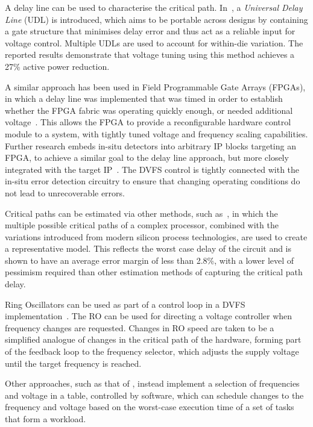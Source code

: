 \documentclass[a4paper,twocolumn,DIV=16]{scrartcl}
\begin{document}
A delay line can be used to characterise the critical path.
In~\cite{Ikenaga2011}, a \emph{Universal Delay Line} (UDL) is introduced, which
aims to be portable across designs by containing a gate structure that minimises
delay error and thus act as a reliable input for voltage control. Multiple UDLs
are used to account for within-die variation. The reported results demonstrate
that voltage tuning using this method achieves a 27\% active power reduction.

A similar approach has been used in Field Programmable Gate Arrays (FPGAs), in
which a delay line was implemented that was timed in order to establish whether
the FPGA fabric was operating quickly enough, or needed additional
voltage~\cite{Nabina2012}. This allows the FPGA to provide a reconfigurable
hardware control module to a system, with tightly tuned voltage and frequency
scaling capabilities. Further research embeds in-situ detectors into arbitrary
IP blocks targeting an FPGA, to achieve a similar goal to the delay line
approach, but more closely integrated with the target IP~\cite{Nunez-Yanez2013}.
The DVFS control is tightly connected with the in-situ error detection circuitry
to ensure that changing operating conditions do not lead to unrecoverable
errors.

Critical paths can be estimated via other methods, such as~\cite{Liu2010}, in
which the multiple possible critical paths of a complex processor, combined with
the variations introduced from modern silicon process technologies, are used to
create a representative model. This reflects the worst case delay of the circuit
and is shown to have an average error margin of less than 2.8\%, with a lower
level of pessimism required than other estimation methods of capturing the
critical path delay. 

Ring Oscillators can be used as part of a control loop in a DVFS
implementation~\cite{burd2000scaled}. The RO can be used for directing a voltage
controller when frequency changes are requested. Changes in RO speed are taken
to be a simplified analogue of changes in the critical path of the hardware,
forming part of the feedback loop to the frequency selector, which adjusts the
supply voltage until the target frequency is reached.

Other approaches, such as that of \cite{lee2000hopping}, instead implement a
selection of frequencies and voltage in a table, controlled by software, which
can schedule changes to the frequency and voltage based on the worst-case
execution time of a set of tasks that form a workload.
\end{document}
